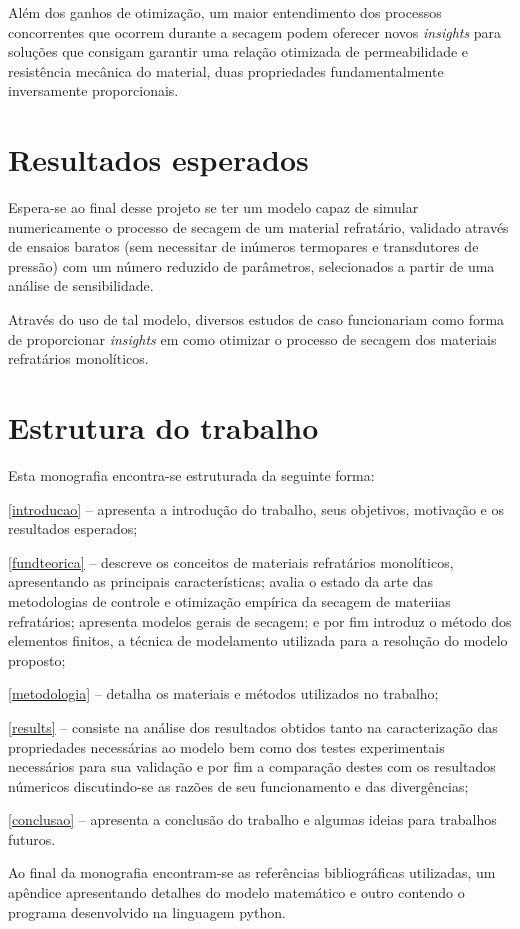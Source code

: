    Além dos ganhos de otimização, um maior entendimento dos processos
   concorrentes que ocorrem durante a secagem podem oferecer novos \textit{insights} para
   soluções que consigam garantir uma relação otimizada de permeabilidade e
   resistência mecânica do material, duas propriedades fundamentalmente
   inversamente proporcionais.


\section{Resultados esperados} \label{results-esperados}
   Espera-se ao final desse projeto se ter um modelo capaz de simular
   numericamente o processo de secagem de um material refratário, validado
   através de ensaios baratos (sem necessitar de inúmeros termopares e transdutores de
   pressão) com um número reduzido de parâmetros, selecionados a partir de uma
   análise de sensibilidade.

   Através do uso de tal modelo, diversos estudos de caso funcionariam como
   forma de proporcionar \textit{insights} em como otimizar o processo de secagem dos
   materiais refratários monolíticos.

    
\section{Estrutura do trabalho}
    
Esta monografia encontra-se estruturada da seguinte forma:
    
\autoref{introducao} – apresenta a introdução do trabalho, seus objetivos, motivação e os resultados esperados;
    
\autoref{fundteorica} – descreve os conceitos de materiais refratários monolíticos, apresentando as principais características; avalia o estado da arte das metodologias de controle e otimização empírica da secagem de materiias refratários; apresenta modelos gerais de secagem; e por fim introduz o método dos elementos finitos, a técnica de modelamento utilizada para a resolução do modelo proposto;
    
\autoref{metodologia} – detalha os materiais e métodos utilizados no trabalho;
    
\autoref{results} – consiste na análise dos resultados obtidos tanto na caracterização das propriedades necessárias ao modelo bem como dos testes experimentais necessários para sua validação e por fim a comparação destes com os resultados númericos discutindo-se as razões de seu funcionamento e das divergências;

\autoref{conclusao} – apresenta a conclusão do trabalho e algumas ideias para trabalhos futuros.
    
Ao final da monografia encontram-se as referências bibliográficas utilizadas, um apêndice apresentando detalhes do modelo matemático e outro contendo o programa desenvolvido na linguagem python.